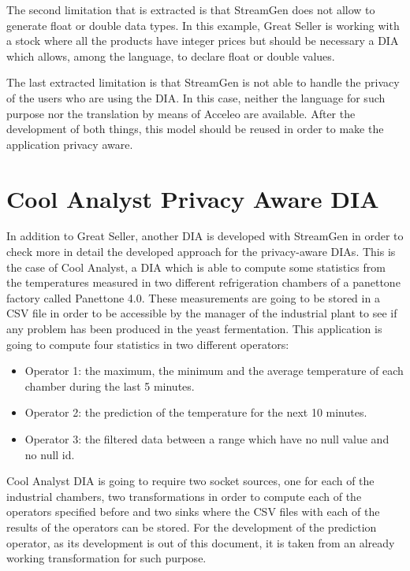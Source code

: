 The second limitation that is extracted is that StreamGen does not allow to generate float or double data types. In this example, Great Seller is working with a stock where all the products have integer prices but should be necessary a DIA which allows, among the language, to declare float or double values.

The last extracted limitation is that StreamGen is not able to handle the privacy of the users who are using the DIA. In this case, neither the language for such purpose nor the translation by means of Acceleo are available. After the development of both things, this model should be reused in order to make the application privacy aware.

\section{Cool Analyst Privacy Aware DIA}

In addition to Great Seller, another DIA is developed with StreamGen in order to check more in detail the developed approach for the privacy-aware DIAs. This is the case of Cool Analyst, a DIA which is able to compute some statistics from the temperatures measured in two different refrigeration chambers of a panettone factory called Panettone 4.0. These measurements are going to be stored in a CSV file in order to be accessible by the manager of the industrial plant to see if any problem has been produced in the yeast fermentation. This application is going to compute four statistics in two different operators:

\begin{itemize}
\item Operator 1: the maximum, the minimum and the average temperature of each chamber during the last 5 minutes.
\item Operator 2: the prediction of the temperature for the next 10 minutes.
\item Operator 3: the filtered data between a range which have no null value and no null id.
\end{itemize}

Cool Analyst DIA is going to require two socket sources, one for each of the industrial chambers, two transformations in order to compute each of the operators specified before and two sinks where the CSV files with each of the results of the operators can be stored. For the development of the prediction operator, as its development is out of this document, it is taken from an already working transformation for such purpose.

